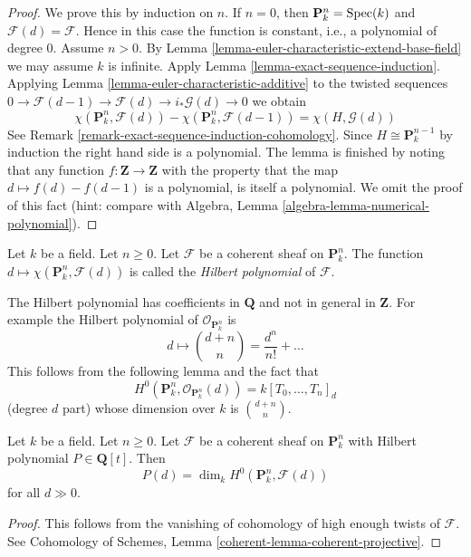 \begin{proof}
We prove this by induction on $n$. If $n = 0$, then
$\mathbf{P}^n_k = \mathop{\mathrm{Spec}}(k)$ and $\mathcal{F}(d) = \mathcal{F}$.
Hence in this case the function is constant, i.e., a polynomial
of degree $0$. Assume $n > 0$. By
Lemma \ref{lemma-euler-characteristic-extend-base-field}
we may assume $k$ is infinite. Apply
Lemma \ref{lemma-exact-sequence-induction}.
Applying Lemma \ref{lemma-euler-characteristic-additive}
to the twisted sequences
$0 \to \mathcal{F}(d - 1) \to \mathcal{F}(d) \to i_*\mathcal{G}(d) \to 0$
we obtain
$$
\chi(\mathbf{P}^n_k, \mathcal{F}(d)) -
\chi(\mathbf{P}^n_k, \mathcal{F}(d - 1)) =
\chi(H, \mathcal{G}(d))
$$
See Remark \ref{remark-exact-sequence-induction-cohomology}.
Since $H \cong \mathbf{P}^{n - 1}_k$
by induction the right hand side is a polynomial.
The lemma is finished by noting that any function
$f : \mathbf{Z} \to \mathbf{Z}$ with the property that the map
$d \mapsto f(d) - f(d - 1)$ is a polynomial, is itself a polynomial.
We omit the proof of this fact (hint: compare with
Algebra, Lemma \ref{algebra-lemma-numerical-polynomial}).
\end{proof}

\begin{definition}
\label{definition-hilbert-polynomial}
Let $k$ be a field. Let $n \geq 0$. Let $\mathcal{F}$ be a coherent sheaf
on $\mathbf{P}^n_k$. The function
$d \mapsto \chi(\mathbf{P}^n_k, \mathcal{F}(d))$ is called the
{\it Hilbert polynomial} of $\mathcal{F}$.
\end{definition}

\noindent
The Hilbert polynomial has coefficients in $\mathbf{Q}$ and not
in general in $\mathbf{Z}$. For example the Hilbert polynomial
of $\mathcal{O}_{\mathbf{P}^n_k}$ is
$$
d \longmapsto {d + n \choose n} = \frac{d^n}{n!} + \ldots
$$
This follows from the following lemma and the fact that
$$
H^0(\mathbf{P}^n_k, \mathcal{O}_{\mathbf{P}^n_k}(d)) = k[T_0, \ldots, T_n]_d
$$
(degree $d$ part) whose dimension over $k$ is ${d + n \choose n}$.

\begin{lemma}
\label{lemma-hilbert-polynomial-H0}
Let $k$ be a field. Let $n \geq 0$. Let $\mathcal{F}$ be a coherent sheaf
on $\mathbf{P}^n_k$ with Hilbert polynomial $P \in \mathbf{Q}[t]$.
Then
$$
P(d) = \dim_k H^0(\mathbf{P}^n_k, \mathcal{F}(d))
$$
for all $d \gg 0$.
\end{lemma}

\begin{proof}
This follows from the vanishing of cohomology of high enough twists
of $\mathcal{F}$. See
Cohomology of Schemes,
Lemma \ref{coherent-lemma-coherent-projective}.
\end{proof}


